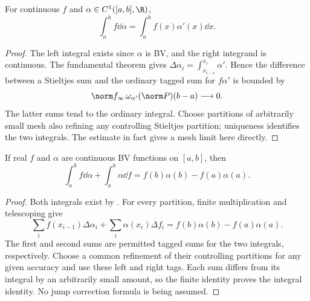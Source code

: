 \begin{theorem}
For continuous $f$ and $\alpha\in C^1([a,b],\R)$,
\[\int_a^b f\dd\alpha=\int_a^bf(x)\alpha'(x)\dd x.\]
\end{theorem}
\begin{proof}
The left integral exists since $\alpha$ is BV, and the right integrand is continuous. The fundamental theorem gives $\Delta\alpha_i=\int_{x_{i-1}}^{x_i}\alpha'$. Hence the difference between a Stieltjes sum and the ordinary tagged sum for $f\alpha'$ is bounded by
\[\norm f_\infty\,\omega_{\alpha'}(\norm P)(b-a)\longrightarrow0.\]
The latter sums tend to the ordinary integral. Choose partitions of arbitrarily small mesh also refining any controlling Stieltjes partition; uniqueness identifies the two integrals. The estimate in fact gives a mesh limit here directly.
\end{proof}

\begin{theorem}
If real $f$ and $\alpha$ are continuous BV functions on $[a,b]$, then
\[\int_a^bf\dd\alpha+\int_a^b\alpha\dd f=f(b)\alpha(b)-f(a)\alpha(a).\]
\end{theorem}
\begin{proof}
Both integrals exist by . For every partition, finite multiplication and telescoping give
\[\sum_i f(x_{i-1})\Delta\alpha_i+\sum_i\alpha(x_i)\Delta f_i=f(b)\alpha(b)-f(a)\alpha(a).\]
The first and second sums are permitted tagged sums for the two integrals, respectively. Choose a common refinement of their controlling partitions for any given accuracy and use these left and right tags. Each sum differs from its integral by an arbitrarily small amount, so the finite identity proves the integral identity. No jump correction formula is being assumed.
\end{proof}

